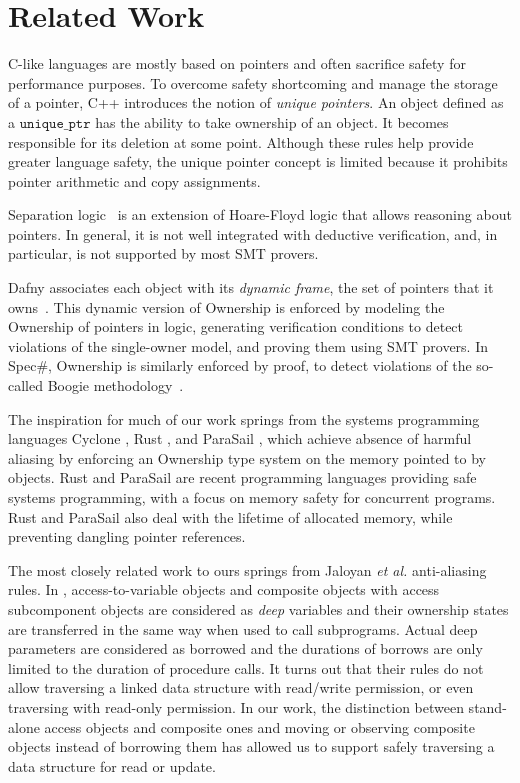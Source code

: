 \documentclass{llncs}
\newcommand\var[1]{\ensuremath{\mathtt{#1}}}
\begin{document}
\section{Related Work}

C-like languages are mostly based on pointers and often sacrifice safety for performance purposes.
To overcome safety shortcoming and manage the storage of a pointer, C++ introduces the notion of \textit{unique pointers}. An object defined as a \var{unique\_ptr}
has the ability to take ownership of an object. It becomes responsible for its deletion at some point. Although these rules help provide greater language safety, the unique
pointer concept is limited because it prohibits pointer arithmetic and copy assignments.

Separation logic~\cite{Reynolds02} is an extension of Hoare-Floyd logic that allows reasoning about pointers. In general, it is not well integrated with deductive
verification, and, in particular, is not supported by most SMT provers.


Dafny associates each object with its \emph{dynamic frame}, the set of pointers that it owns~\cite{Leino10}. This dynamic version of Ownership is
enforced by modeling the Ownership of pointers in logic, generating verification conditions to detect violations of the single-owner model, and proving
them using SMT provers. In Spec\#, Ownership is similarly enforced by proof, to detect violations of the so-called Boogie methodology~\cite{Boogie}.

The inspiration for much of our work springs from the systems programming languages Cyclone \cite{Grossman2002}, Rust \cite{Balasubramanian17}, and ParaSail \cite{Taft11}, which achieve absence of
harmful aliasing by enforcing an Ownership type system on the memory pointed to by objects. Rust and ParaSail are recent programming languages providing safe systems
programming, with a focus on memory safety for concurrent programs.
Rust and ParaSail also deal with the lifetime of allocated memory, while preventing dangling pointer references.

The most closely related work to ours springs from Jaloyan \textit{et al.} \cite{Jaloyan18} anti-aliasing rules. In \cite{Jaloyan18}, access-to-variable objects
and composite objects with access subcomponent objects are considered as \textit{deep} variables and their ownership states are transferred in the same way when used to call subprograms.
Actual deep parameters are considered as borrowed and the durations of borrows are only limited to the duration of procedure calls.
It turns out that their rules do not allow traversing a linked data structure with read/write permission, or even traversing with read-only permission. In our work, the distinction between stand-alone access
objects and composite ones and moving or observing composite objects instead of borrowing them has allowed us to support safely traversing a data structure for read or update.
\end{document}
